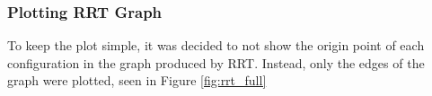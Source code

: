     \subsubsection{Plotting RRT Graph}
        To keep the plot simple, it was decided to not show the origin point of each configuration in the graph produced by \gls{RRT}. Instead, only the edges of the graph were plotted, seen in Figure \ref{fig:rrt_full}
        
        
